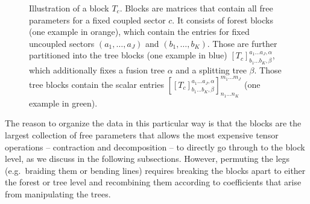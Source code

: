 \begin{figure}[ht]
{}
    \caption[
        Illustration of blocks $T_c$, the free parameters of symmetric tensors.
    ]{
        Illustration of a block $T_c$.
        Blocks are matrices that contain all free parameters for a fixed coupled sector $c$.
        It consists of forest blocks (one example in orange), which contain the entries for fixed uncoupled sectors $(a_1,\dots,a_J)$ and $(b_1,\dots,b_K)$.
        Those are further partitioned into the tree blocks (one example in blue) $[T_c]^{a_1\dots a_J,\alpha}_{b_1\dots b_K,\beta}$, which additionally fixes a fusion tree $\alpha$ and a splitting tree $\beta$.
        Those tree blocks contain the scalar entries $[[T_c]^{a_1\dots a_J, \alpha}_{b_1\dots b_K,\beta}]^{m_1\dots m_J}_{n_1\dots n_K}$ (one example in green).
    }
    \label{fig:nonabelian:tensors:block}
\end{figure}

The reason to organize the data in this particular way is that the blocks are the largest collection of free parameters that allows the most expensive tensor operations -- contraction and decomposition -- to directly go through to the block level, as we discuss in the following subsections.
%
However, permuting the legs (e.g.~braiding them or bending lines) requires breaking the blocks apart to either the forest or tree level and recombining them according to coefficients that arise from manipulating the trees.


